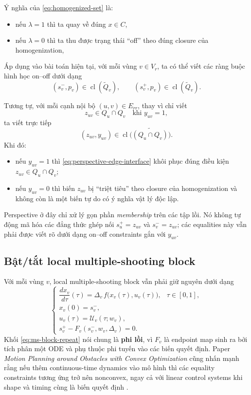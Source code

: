 \documentclass[12pt]{article}
\begin{document}
Ý nghĩa của \eqref{eq:homogenized-set} là:
\begin{itemize}
    \item nếu $\lambda=1$ thì ta quay về đúng $x\in C$,
    \item nếu $\lambda=0$ thì ta thu được trạng thái ``off'' theo đúng closure của homogenization,
\end{itemize}

Áp dụng vào bài toán hiện tại, với mỗi vùng $v\in V_r$, ta có thể viết các ràng buộc hình học on--off dưới dạng
\begin{equation}
(s_v^-,p_v)\in \operatorname{cl}(\widetilde{Q}_v),
\qquad
(s_v^+,p_v)\in \operatorname{cl}(\widetilde{Q}_v).
\label{eq:perspective-vertex-states}
\end{equation}

Tương tự, với mỗi cạnh nội bộ $(u,v)\in E_{rr}$, thay vì chỉ viết
\[
z_{uv}\in Q_u\cap Q_v
\quad\text{khi } y_{uv}=1,
\]
ta viết trực tiếp
\begin{equation}
(z_{uv},y_{uv})
\in
\operatorname{cl}\!\bigl(\widetilde{(Q_u\cap Q_v)}\bigr).
\label{eq:perspective-edge-interface}
\end{equation}
Khi đó:
\begin{itemize}
    \item nếu $y_{uv}=1$ thì \eqref{eq:perspective-edge-interface} khôi phục đúng điều kiện $z_{uv}\in Q_u\cap Q_v$;
    \item nếu $y_{uv}=0$ thì biến $z_{uv}$ bị ``triệt tiêu'' theo closure của homogenization và không còn là một biến tự do có ý nghĩa vật lý độc lập.
\end{itemize}

Perspective ở đây chỉ xử lý gọn phần \emph{membership} trên các tập lồi. Nó không tự động mã hóa các đẳng thức ghép nối $s_u^+=z_{uv}$ và $s_v^-=z_{uv}$; các equalities này vẫn phải được viết rõ dưới dạng on--off constraints gắn với $y_{uv}$.

\subsection{Bật/tắt local multiple-shooting block}
Với mỗi vùng $v$, local multiple-shooting block vẫn phải giữ nguyên dưới dạng
\begin{equation}
\begin{cases}
\dfrac{d x_v}{d\tau}(\tau)=\Delta_v\,f\bigl(x_v(\tau),u_v(\tau)\bigr), & \tau\in[0,1],\\[4pt]
x_v(0)=s_v^-,\\
u_v(\tau)=\mathcal U_v(\tau;w_v),\\[2pt]
s_v^+ - F_v(s_v^-,w_v,\Delta_v)=0.
\end{cases}
\label{eq:ms-block-repeat}
\end{equation}
Khối \eqref{eq:ms-block-repeat} nói chung là \textbf{phi lồi}, vì $F_v$ là endpoint map sinh ra bởi tích phân một ODE và phụ thuộc phi tuyến vào các biến quyết định. Paper \emph{Motion Planning around Obstacles with Convex Optimization} cũng nhấn mạnh rằng nếu thêm continuous-time dynamics vào mô hình thì các equality constraints tương ứng trở nên nonconvex, ngay cả với linear control systems khi shape và timing cùng là biến quyết định \cite{marcucci2022}.
\end{document}
